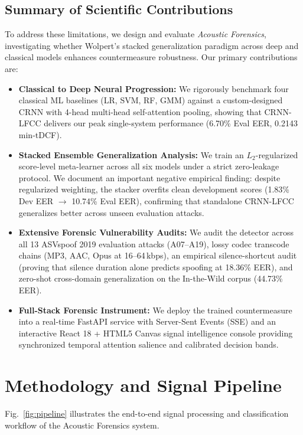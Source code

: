 \documentclass[conference]{IEEEtran}
\begin{document}
\subsection{Summary of Scientific Contributions}
To address these limitations, we design and evaluate \textit{Acoustic Forensics}, investigating whether Wolpert's stacked generalization paradigm \cite{wolpert1992stacked} across deep and classical models enhances countermeasure robustness. Our primary contributions are:
\begin{itemize}
    \item \textbf{Classical to Deep Neural Progression:} We rigorously benchmark four classical ML baselines (LR, SVM, RF, GMM) against a custom-designed CRNN with 4-head multi-head self-attention pooling, showing that CRNN-LFCC delivers our peak single-system performance (6.70\% Eval EER, 0.2143 min-tDCF).
    \item \textbf{Stacked Ensemble Generalization Analysis:} We train an $L_2$-regularized score-level meta-learner across all six models under a strict zero-leakage protocol. We document an important negative empirical finding: despite regularized weighting, the stacker overfits clean development scores (1.83\% Dev EER $\rightarrow$ 10.74\% Eval EER), confirming that standalone CRNN-LFCC generalizes better across unseen evaluation attacks.
    \item \textbf{Extensive Forensic Vulnerability Audits:} We audit the detector across all 13 ASVspoof 2019 evaluation attacks (A07--A19), lossy codec transcode chains (MP3, AAC, Opus at 16--64\,kbps), an empirical silence-shortcut audit (proving that silence duration alone predicts spoofing at 18.36\% EER), and zero-shot cross-domain generalization on the In-the-Wild corpus (44.73\% EER).
    \item \textbf{Full-Stack Forensic Instrument:} We deploy the trained countermeasure into a real-time FastAPI service with Server-Sent Events (SSE) and an interactive React 18 + HTML5 Canvas signal intelligence console providing synchronized temporal attention salience and calibrated decision bands.
\end{itemize}

\section{Methodology and Signal Pipeline}

Fig.~\ref{fig:pipeline} illustrates the end-to-end signal processing and classification workflow of the Acoustic Forensics system.
\end{document}
